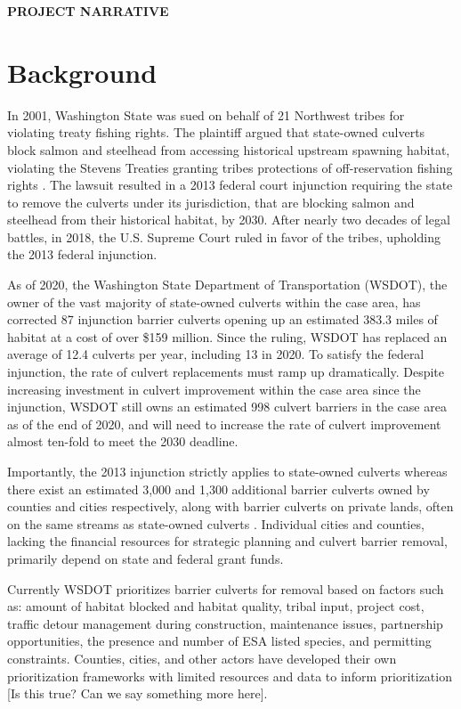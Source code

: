 \documentclass[12pt]{elsarticle}
\begin{document}
\begin{center} \textbf{PROJECT NARRATIVE} \end{center}


\section{Background} 
In 2001, Washington State was sued on behalf of 21 Northwest tribes for violating treaty fishing rights. The plaintiff argued that state-owned culverts block salmon and steelhead from accessing historical upstream spawning habitat, violating the Stevens Treaties granting tribes protections of off-reservation fishing rights \citep{hickey2018highway}. The lawsuit resulted in a 2013 federal court injunction requiring the state to remove the culverts under its jurisdiction, that are blocking salmon and steelhead from their historical habitat, by 2030. After nearly two decades of legal battles, in 2018, the U.S. Supreme Court ruled in favor of the tribes, upholding the 2013 federal injunction. 

As of 2020, the Washington State Department of Transportation (WSDOT), the owner of the vast majority of state-owned culverts within the case area, has corrected 87 injunction barrier culverts opening up an estimated 383.3 miles of habitat at a cost of over \$159 million. Since the ruling, WSDOT has replaced an average of 12.4 culverts per year, including 13 in 2020. To satisfy the federal injunction, the rate of culvert replacements must ramp up dramatically. Despite increasing investment in culvert improvement within the case area since the injunction, WSDOT still owns an estimated 998 culvert barriers in the case area as of the end of 2020, and will need to increase the rate of culvert improvement almost ten-fold to meet the 2030 deadline.  

Importantly, the 2013 injunction strictly applies to state-owned culverts whereas there exist an estimated 3,000 and 1,300 additional barrier culverts owned by counties and cities respectively, along with barrier culverts on private lands, often on the same streams as state-owned culverts \citep{brown2019coming}. Individual cities and counties, lacking the financial resources for strategic planning and culvert barrier removal, primarily depend on state and federal grant funds.

Currently WSDOT prioritizes barrier culverts for removal based on factors such as: amount of habitat blocked and habitat quality, tribal input, project cost, traffic detour management during construction, maintenance issues, partnership opportunities, the presence and number of ESA listed species, and permitting constraints. Counties, cities, and other actors have developed their own prioritization frameworks with limited resources and data to inform prioritization [Is this true? Can we say something more here]. 
\end{document}
